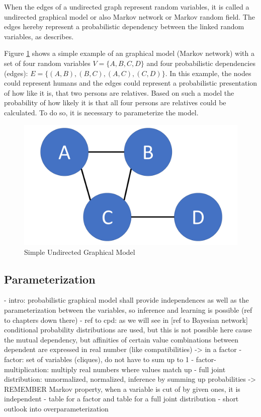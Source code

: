 When the edges of a undirected graph represent random variables, it is called a undirected graphical model or also Markov network or Markov random field. The edges hereby represent a probabilistic dependency between the linked random variables, as \cite{kindermann1980markov} describes.

Figure \ref{fig:basic} shows a simple example of an graphical model (Markov network) with a set of four random variables $V=\{A,B,C,D\}$ and four probabilistic dependencies (edges): $E=\{(A,B),(B,C),(A,C),(C,D)\}$. In this example, the nodes could represent humans and the edges could represent a probabilistic presentation of how like it is, that two persons are relatives. Based on such a model the probability of how likely it is that all four persons are relatives could be calculated. To do so, it is necessary to parameterize the model.

\begin{figure}[htpb]
  \centering
  	\includegraphics[scale=0.3]{img/basic.pdf} 
  \caption{Simple Undirected Graphical Model}
  \label{fig:basic}
\end{figure}

\subsection{Parameterization}

- intro: probabilistic graphical model shall provide independences as well as the parameterization between the variables, so inference and learning is possible (ref to chapters down there)
- ref to cpd: as we will see in [ref to Bayesian network] conditional probability distributions are used, but this is not possible here cause the mutual dependency, but affinities of certain value combinations between dependent are expressed in real number (like compatibilities) -> in a factor
- factor: set of variables (cliques), do not have to sum up to 1
- factor-multiplication: multiply real numbers where values match up
- full joint distribution: unnormalized, normalized, inference by summing up probabilities -> REMEMBER Markov property, when a variable is cut of by given ones, it is independent
- table for a factor and table for a full joint distribution
- short outlook into overparameterization

